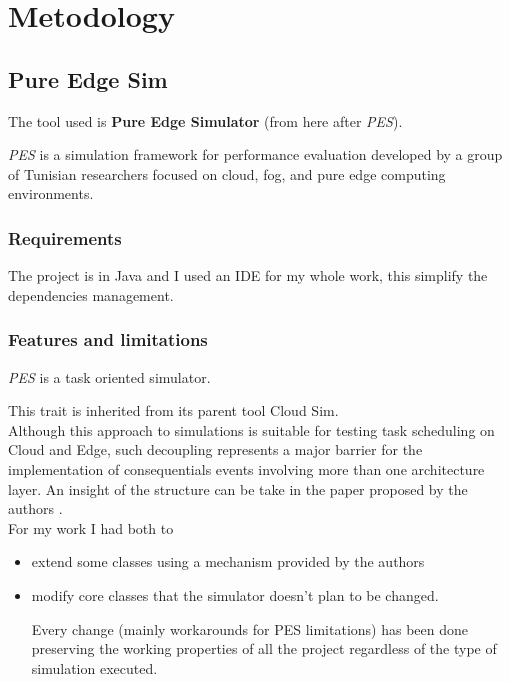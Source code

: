 \documentclass[12pt]{report}
\begin{document}
\part*{Metodology}
\chapter{Pure Edge Sim}
\label{PES}
The tool used is \textbf{Pure Edge Simulator} (from here after \textit{PES}).

\textit{PES} is a simulation framework for performance evaluation developed by a group of Tunisian researchers focused on cloud, fog, and pure edge computing environments.

\section{Requirements}
The project is in Java and I used an IDE for my whole work, this simplify the dependencies management.

\section{Features and limitations}
\textit{PES} is a task oriented simulator.

This trait is inherited from its parent tool Cloud Sim.\\
Although this approach to simulations is suitable for testing task scheduling on Cloud and Edge, such decoupling represents a major barrier for the implementation of consequentials events involving more than one architecture layer.
An insight of the structure can be take in the paper proposed by the authors \cite{MechalikhTM21}.
\\
For my work I had both to
\begin{itemize}
	\item extend some classes using a mechanism provided by the authors
	\item modify core classes that the simulator doesn't plan to be changed.
	
	Every change (mainly workarounds for PES limitations) has been done preserving the working properties of all the project regardless of the type of simulation executed.
\end{itemize}
\end{document}
